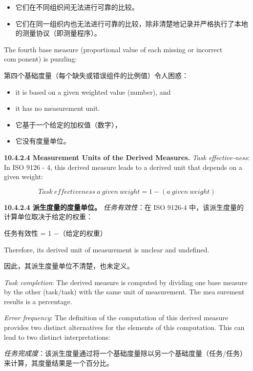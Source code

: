 \begin{itemize}
\item 它们在不同组织间无法进行可靠的比较。
\item 它们在同一组织内也无法进行可靠的比较，除非清楚地记录并严格执行了本地的测量协议（即测量程序）。
\end{itemize}

The fourth base measure (proportional value of each missing or incorrect com￾ponent) is puzzling:

第四个基础度量（每个缺失或错误组件的比例值）令人困惑：

\begin{itemize}
 \item it is based on a given weighted value (number), and 
 \item it has no measurement unit.
\end{itemize}

\begin{itemize}
\item 它基于一个给定的加权值（数字），
\item 它没有度量单位。
\end{itemize}

\textbf{10.4.2.4 Measurement Units of the Derived Measures.} \textit{Task effective-ness}: In ISO 9126 - 4, this derived measure leads to a derived unit that depends 
on a given weight:

\[
Task\ effectiveness\ a\ given\ weight = 1 - (a\ given\ weight)
\]

\textbf{10.4.2.4 派生度量的度量单位。} \textit{任务有效性}：在 ISO 9126-4 中，该派生度量的计算单位取决于给定的权重：

\begin{center}
任务有效性 = 1 −（给定的权重）
\end{center}

Therefore, its derived unit of measurement is unclear and undefined.

因此，其派生度量单位不清楚，也未定义。

\textit{Task completion}: The derived measure is computed by dividing one base 
measure by the other (task/task) with the same unit of measurement. The mea￾surement results is a percentage.

\textit{Error frequency}: The definition of the computation of this derived measure 
provides two distinct alternatives for the elements of this computation. This can 
lead to two distinct interpretations:

\textit{任务完成度}：该派生度量通过将一个基础度量除以另一个基础度量（任务/任务）来计算，其度量结果是一个百分比。

